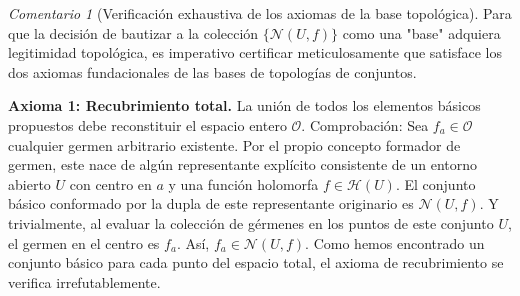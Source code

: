 \documentclass[11pt,a4paper]{article}
\theoremstyle{definition}
\theoremstyle{remark}
\newtheorem{observacion}{Comentario}[section]
\numberwithin{equation}{section}
\begin{document}
\begin{observacion}[Verificación exhaustiva de los axiomas de la base topológica]
Para que la decisión de bautizar a la colección $\{ \mathcal{N}(U, f) \}$ como una "base" adquiera legitimidad topológica, es imperativo certificar meticulosamente que satisface los dos axiomas fundacionales de las bases de topologías de conjuntos.

\textbf{Axioma 1: Recubrimiento total.} La unión de todos los elementos básicos propuestos debe reconstituir el espacio entero $\mathcal{O}$.
Comprobación: Sea $f_a \in \mathcal{O}$ cualquier germen arbitrario existente. Por el propio concepto formador de germen, este nace de algún representante explícito consistente de un entorno abierto $U$ con centro en $a$ y una función holomorfa $f \in \mathcal{H}(U)$. El conjunto básico conformado por la dupla de este representante originario es $\mathcal{N}(U, f)$. Y trivialmente, al evaluar la colección de gérmenes en los puntos de este conjunto $U$, el germen en el centro es $f_a$. Así, $f_a \in \mathcal{N}(U, f)$. Como hemos encontrado un conjunto básico para cada punto del espacio total, el axioma de recubrimiento se verifica irrefutablemente.


\end{observacion}
\end{document}
